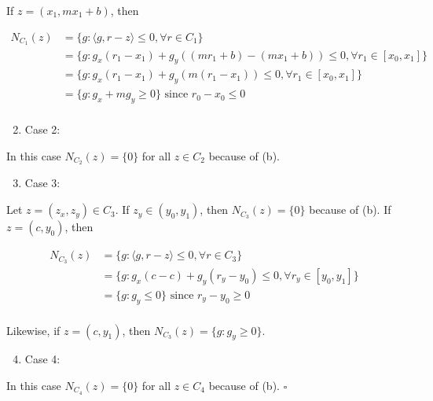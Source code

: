 \documentclass[10pt]{article}
\begin{document}
If $z = (x_1, m x_1 + b)$, then

\begin{align*}
  N_{C_1}(z) &= \{ g: \langle g, r - z \rangle \leq 0, \forall r \in C_1 \}\\
  &= \{ g: g_x (r_1 - x_1) + g_y ((m r_1 + b) - (m x_1 + b)) \leq 0, \forall r_1 \in [x_0, x_1] \}\\
  &= \{ g: g_x (r_1 - x_1) + g_y (m (r_1 - x_1)) \leq 0, \forall r_1 \in [x_0, x_1] \}\\
  &= \{ g: g_x + m g_y \geq 0\} \text{ since $r_0 - x_0 \leq 0$}\\
\end{align*}


\begin{enumerate}
  \setcounter{enumi}{1}
  \item Case 2:
\end{enumerate}

In this case $N_{C_2}(z) = \{ 0 \}$ for all $z \in C_2$ because of (b).\\

\begin{enumerate}
  \setcounter{enumi}{2}
  \item Case 3:
\end{enumerate}

Let $z = (z_x, z_y) \in C_3$. If $z_y \in (y_0, y_1)$, then $N_{C_3}(z) = \{ 0 \}$ because of (b).
If $z = (c, y_0)$, then 

\begin{align*}
  N_{C_3}(z) &= \{ g: \langle g, r - z \rangle \leq 0, \forall r \in C_3 \}\\
  &= \{ g: g_x (c - c) + g_y (r_y - y_0) \leq 0, \forall r_y \in [y_0, y_1] \}\\
  &= \{ g: g_y \leq 0\} \text{ since } r_y - y_0 \geq 0 \\
\end{align*}

Likewise, if $z = (c, y_1)$, then $N_{C_3}(z) = \{ g: g_y \geq 0\}$.\\

\begin{enumerate}
  \setcounter{enumi}{3}
  \item Case 4:
\end{enumerate}

In this case $N_{C_4}(z) = \{ 0 \}$ for all $z \in C_4$ because of (b). $\square$




\hfill \break %
\end{document}
